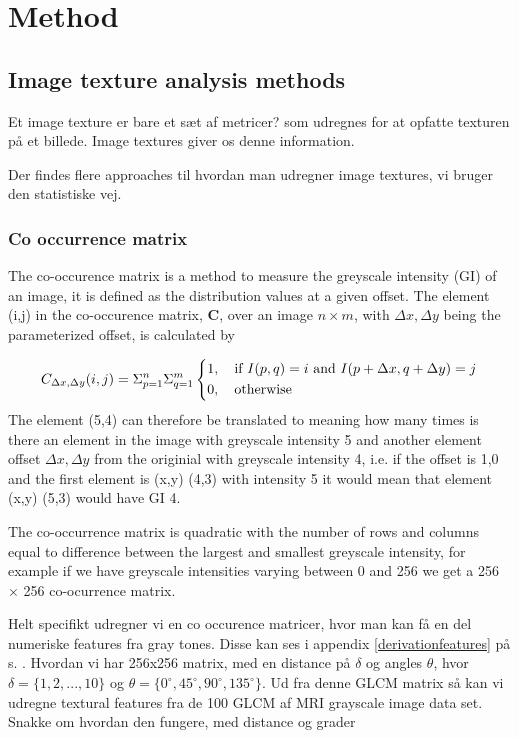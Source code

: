 \chapter{Method}

\section{Image texture analysis methods}



Et image texture er bare et sæt af metricer? som udregnes for at opfatte texturen på et billede. Image textures giver os denne information.

Der findes flere approaches til hvordan man udregner image textures, vi bruger den statistiske vej.

\subsection{Co occurrence matrix}
The co-occurence matrix is a method to measure the greyscale intensity (GI) of an image, it is defined as the distribution values at a given offset. The element (i,j) in the co-occurence matrix, \textbf{C}, over an image $n \times m$, with $\Delta x, \Delta y$ being the parameterized offset, is calculated by

\[
C_{\Delta x, \Delta y}(i, j) = \Sigma_{p=1}^n\Sigma_{q=1}^m
\begin{dcases}
  1, \quad \text{if } I(p,q)=i \text{ and } I(p+\Delta x, q+ \Delta y) =j \\
  0, \quad \text{otherwise}
\end{dcases}
\]
The element (5,4) can therefore be translated to meaning how many times is there an element in the image with greyscale  intensity 5 and another element offset $\Delta x, \Delta y$ from the originial with greyscale intensity 4, i.e. if the offset is 1,0 and the first element is (x,y) (4,3) with intensity 5 it would mean that element (x,y) (5,3) would have GI 4.


The co-occurrence matrix is quadratic with the number of rows and columns equal to difference between the largest and smallest greyscale intensity, for example if we have greyscale intensities varying between 0 and 256 we get a 256 $\times$ 256 co-ocurrence matrix.



Helt specifikt udregner vi en co occurence matricer, hvor man kan få en del numeriske features fra gray tones. Disse kan ses i appendix \ref{derivationfeatures} på s. \pageref{derivationfeatures}.
Hvordan vi har 256x256 matrix, med en distance på $\delta$ og angles $\theta$, hvor $\delta = \{1,2,...,10\}$ og $\theta = \{0^\circ, 45^\circ, 90^\circ, 135^\circ\}$.
Ud fra denne GLCM matrix så kan vi udregne textural features fra de 100 GLCM af MRI grayscale image data set.
Snakke om hvordan den fungere, med distance og grader






